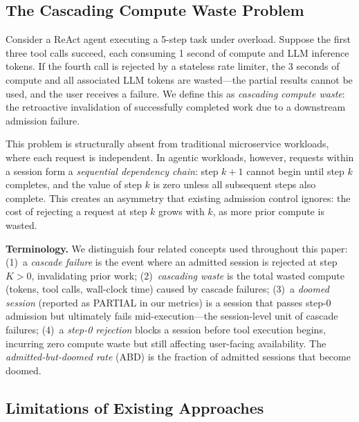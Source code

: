 \documentclass[sigconf,review,anonymous]{acmart}
\begin{document}
\subsection{The Cascading Compute Waste Problem}

Consider a ReAct agent executing a 5-step task under overload. Suppose the first three tool calls succeed, each consuming 1 second of compute and LLM inference tokens. If the fourth call is rejected by a stateless rate limiter, the 3 seconds of compute and all associated LLM tokens are wasted---the partial results cannot be used, and the user receives a failure. We define this as \emph{cascading compute waste}: the retroactive invalidation of successfully completed work due to a downstream admission failure.


This problem is structurally absent from traditional microservice workloads, where each request is independent. In agentic workloads, however, requests within a session form a \emph{sequential dependency chain}: step $k+1$ cannot begin until step $k$ completes, and the value of step $k$ is zero unless all subsequent steps also complete. This creates an asymmetry that existing admission control ignores: the cost of rejecting a request at step $k$ grows with $k$, as more prior compute is wasted.

\textbf{Terminology.} We distinguish four related concepts used throughout this paper: (1)~a \emph{cascade failure} is the event where an admitted session is rejected at step $K>0$, invalidating prior work; (2)~\emph{cascading waste} is the total wasted compute (tokens, tool calls, wall-clock time) caused by cascade failures; (3)~a \emph{doomed session} (reported as PARTIAL in our metrics) is a session that passes step-0 admission but ultimately fails mid-execution---the session-level unit of cascade failures; (4)~a \emph{step-0 rejection} blocks a session before tool execution begins, incurring zero compute waste but still affecting user-facing availability. The \emph{admitted-but-doomed rate} (ABD) is the fraction of admitted sessions that become doomed.


\subsection{Limitations of Existing Approaches}
\end{document}

